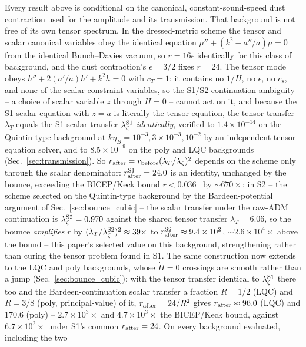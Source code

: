 \documentclass[aps,prd,twocolumn,superscriptaddress,nofootinbib,longbibliography]{revtex4-2}
\begin{document}
Every result above is conditional on the canonical, constant-sound-speed
dust contraction used for the amplitude and its transmission. That
background is not free of its own tensor spectrum. In the dressed-metric
scheme the tensor and scalar canonical variables obey the identical
equation $\mu''+(k^2-a''/a)\mu=0$ from the identical Bunch--Davies
vacuum, so $r=16\epsilon$ identically for this class of background, and
the dust contraction's $\epsilon=3/2$ fixes $r=24$. The tensor mode
obeys $h''+2(a'/a)h'+k^2h=0$ with $c_T=1$: it contains no $1/H$, no
$\epsilon$, no $c_s$, and none of the scalar constraint variables, so
the S1/S2 continuation ambiguity -- a choice of scalar variable $z$
through $H=0$ -- cannot act on it, and because the S1 scalar equation
with $z=a$ is literally the tensor equation, the tensor transfer
$\lambda_T$ equals the S1 scalar transfer $\lambda_\zeta^{\rm S1}$
\emph{identically}, verified to $1.4\times10^{-14}$ on the Quintin-type
background at $k\eta_B=10^{-3},3\times10^{-3},10^{-2}$ by an independent
tensor-equation solver, and to $8.5\times10^{-9}$ on the poly and LQC
backgrounds (Sec.~\ref{sec:transmission}). So $r_{\rm after}=r_{\rm
before}(\lambda_T/\lambda_\zeta)^2$ depends on the scheme only through
the scalar denominator: $r_{\rm after}^{\rm S1}=24.0$ is an identity,
unchanged by the bounce, exceeding the BICEP/Keck bound
$r<0.036$~\cite{BicepKeck2021} by $\sim670\times$; in S2 -- the scheme
selected on the Quintin-type background by the Bardeen-potential argument
of Sec.~\ref{sec:bounce_cubic} -- the scalar transfer under the raw-ADM
continuation is $\lambda_\zeta^{\rm
S2}=0.970$ against the shared tensor transfer $\lambda_T=6.06$, so the
bounce \emph{amplifies} $r$ by $(\lambda_T/\lambda_\zeta^{\rm
S2})^2\approx39\times$ to $r_{\rm after}^{\rm S2}\approx9.4\times10^2$,
$\sim2.6\times10^4\times$ above the bound -- this paper's selected value
on this background, strengthening rather than curing the tensor problem
found in S1. The same construction now extends to the LQC and poly backgrounds, whose
$\dot H=0$ crossings are smooth rather than a jump
(Sec.~\ref{sec:bounce_cubic}): with the tensor transfer identical to
$\lambda_\zeta^{\rm S1}$ there too and the Bardeen-continuation scalar
transfer a fraction $R=1/2$ (LQC) and $R=3/8$ (poly, principal-value) of
it, $r_{\rm after}=24/R^2$ gives $r_{\rm after}\approx96.0$ (LQC) and
$170.6$ (poly) -- $2.7\times10^3\times$ and $4.7\times10^3\times$ the
BICEP/Keck bound, against $6.7\times10^2\times$ under S1's common
$r_{\rm after}=24$. On every background evaluated, including the two
\end{document}
